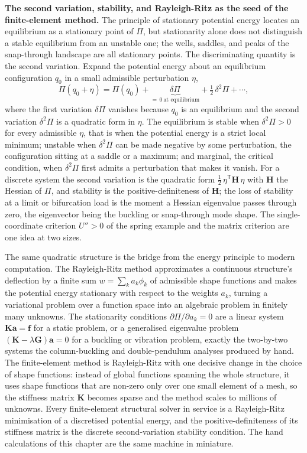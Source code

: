 \begin{mastery}
\textbf{The second variation, stability, and Rayleigh-Ritz as the seed of
the finite-element method.} The principle of stationary potential energy
locates an equilibrium as a stationary point of $\Pi$, but stationarity alone
does not distinguish a stable equilibrium from an unstable one; the wells,
saddles, and peaks of the snap-through landscape are all stationary points.
The discriminating quantity is the second variation. Expand the potential
energy about an equilibrium configuration $q_0$ in a small admissible
perturbation $\eta$,
\[
\Pi(q_0 + \eta) = \Pi(q_0)
+ \underbrace{\delta\Pi}_{=\,0\ \text{at equilibrium}}
+ \tfrac12\,\delta^2\Pi + \cdots,
\]
where the first variation $\delta\Pi$ vanishes because $q_0$ is an
equilibrium and the second variation $\delta^2\Pi$ is a quadratic form in
$\eta$. The equilibrium is stable when $\delta^2\Pi > 0$ for every admissible
$\eta$, that is when the potential energy is a strict local minimum;
unstable when $\delta^2\Pi$ can be made negative by some perturbation,
the configuration sitting at a saddle or a maximum; and marginal, the
critical condition, when $\delta^2\Pi$ first admits a perturbation that makes
it vanish. For a discrete system the second variation is the quadratic form
$\tfrac12\,\eta^{\mathsf T}\mathbf{H}\,\eta$ with $\mathbf{H}$ the Hessian of
$\Pi$, and stability is the positive-definiteness of $\mathbf{H}$; the loss
of stability at a limit or bifurcation load is the moment a Hessian
eigenvalue passes through zero, the eigenvector being the buckling or
snap-through mode shape. The single-coordinate criterion $U'' > 0$ of the
spring example and the matrix criterion are one idea at two sizes.

The same quadratic structure is the bridge from the energy principle to
modern computation. The Rayleigh-Ritz method approximates a continuous
structure's deflection by a finite sum $w = \sum_k a_k\phi_k$ of admissible
shape functions and makes the potential energy stationary with respect to the
weights $a_k$, turning a variational problem over a function space into an
algebraic problem in finitely many unknowns. The stationarity conditions
$\partial\Pi/\partial a_k = 0$ are a linear system $\mathbf{K}\mathbf{a} =
\mathbf{f}$ for a static problem, or a generalised eigenvalue problem
$(\mathbf{K} - \lambda\mathbf{G})\mathbf{a} = 0$ for a buckling or vibration
problem, exactly the two-by-two systems the column-buckling and
double-pendulum analyses produced by hand. The finite-element method is
Rayleigh-Ritz with one decisive change in the choice of shape functions:
instead of global functions spanning the whole structure, it uses shape
functions that are non-zero only over one small element of a mesh, so the
stiffness matrix $\mathbf{K}$ becomes sparse and the method scales to
millions of unknowns. Every finite-element structural solver in service is a
Rayleigh-Ritz minimisation of a discretised potential energy, and the
positive-definiteness of its stiffness matrix is the discrete second-variation
stability condition. The hand calculations of this chapter are the same
machine in miniature.
\end{mastery}

